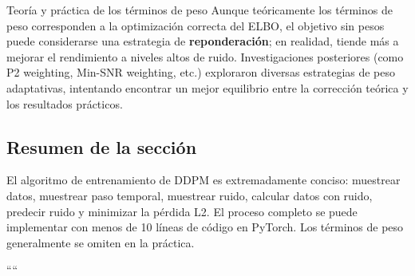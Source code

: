 \begin{knowledgebox}{Teoría y práctica de los términos de peso}
Aunque teóricamente los términos de peso corresponden a la optimización correcta del ELBO, el objetivo sin pesos puede considerarse una estrategia de \textbf{reponderación}; en realidad, tiende más a mejorar el rendimiento a niveles altos de ruido. Investigaciones posteriores (como P2 weighting, Min-SNR weighting, etc.) exploraron diversas estrategias de peso adaptativas, intentando encontrar un mejor equilibrio entre la corrección teórica y los resultados prácticos.
\end{knowledgebox}

\subsection{Resumen de la sección}

El algoritmo de entrenamiento de DDPM es extremadamente conciso: muestrear datos, muestrear paso temporal, muestrear ruido, calcular datos con ruido, predecir ruido y minimizar la pérdida L2. El proceso completo se puede implementar con menos de 10 líneas de código en PyTorch. Los términos de peso generalmente se omiten en la práctica.



````

